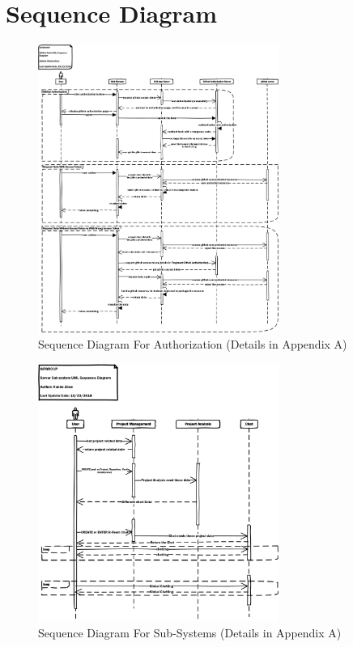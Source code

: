 \documentclass[12pt,a4paper]{report}
\begin{document}
\section{Sequence Diagram}
\begin{figure}[H]
	\centering
	\includegraphics[width=0.7\textwidth]{./pics/AuthSequenceDiagram.png}
	\caption{Sequence Diagram For Authorization (Details in Appendix A)}
\end{figure}

\begin{figure}[H]
	\centering
	\includegraphics[width=0.7\textwidth]{./pics/SubSysSequenceDiagram.png}
	\caption{Sequence Diagram For Sub-Systems (Details in Appendix A)}
\end{figure}
\end{document}

